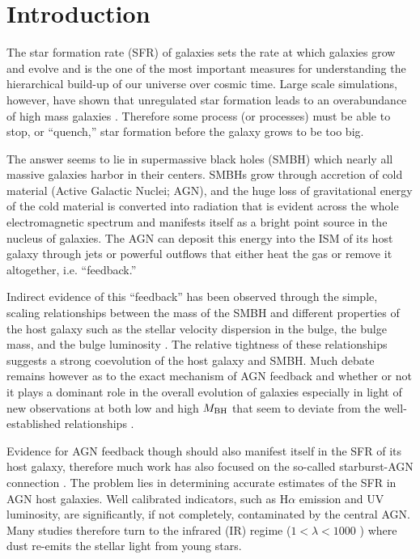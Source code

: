 \section{Introduction}\label{sec:intro}
The star formation rate (SFR) of galaxies sets the rate at which galaxies grow and evolve and is the one of the most important measures for understanding the hierarchical build-up of our universe over cosmic time. Large scale simulations, however, have shown that unregulated star formation leads to an overabundance of high mass galaxies \citep[e.g.][]{Bower:2006gf,Croton:2006kx,Silk:2012fj}. Therefore some process (or processes) must be able to stop, or ``quench,'' star formation before the galaxy grows to be too big.

The answer seems to lie in supermassive black holes (SMBH) which nearly all massive galaxies harbor in their centers. SMBHs grow through accretion of cold material (Active Galactic Nuclei; AGN), and the huge loss of gravitational energy of the cold material is converted into radiation that is evident across the whole electromagnetic spectrum and manifests itself as a bright point source in the nucleus of galaxies. The AGN can deposit this energy into the ISM of its host galaxy through jets \citep[e.g.][]{Fabian:2003ek,Best:2007vn,Lanz:2015bq} or powerful outflows \citep[e.g][]{Alatalo:2011lk,Veilleux:2013qq,Harrison:2014xe,Tombesi:2015fj} that either heat the gas or remove it altogether, i.e. ``feedback.''
  
Indirect evidence of this ``feedback'' has been observed through the simple, scaling relationships between the mass of the SMBH and different properties of the host galaxy such as the stellar velocity dispersion in the bulge, the bulge mass, and the bulge luminosity \citep[e.g.][]{Kormendy:1995mz,Ferrarese:2000gf,Marconi:2003ve,Haring:2004ly,Gultekin:2009ul,Kormendy:2013fj}. The relative tightness of these relationships suggests a strong coevolution of the host galaxy and SMBH. Much debate remains however as to the exact mechanism of AGN feedback and whether or not it plays a dominant role in the overall evolution of galaxies especially in light of new observations at both low and high $M_{\rm BH}$ that seem to deviate from the well-established relationships \citep[see][for a detailed review]{Kormendy:2013fj}. 

Evidence for AGN feedback though should also manifest itself in the SFR of its host galaxy, therefore much work has also focused on the so-called starburst-AGN connection \citep[e.g.][]{Sanders:1988fk,Cid-Fernandes:2001uq,Diamond-Stanic:2012rw,Dixon:2011yq,Rovilos:2012wd,Chen:2013uq,LaMassa:2013hb,Esquej:2014vl,Hickox:2014yq,Mushotzky:2014ad}. The problem lies in determining accurate estimates of the SFR in AGN host galaxies. Well calibrated indicators, such as H$\alpha$ emission and UV luminosity, are significantly, if not completely, contaminated by the central AGN. Many studies therefore turn to the infrared (IR) regime ($1<\lambda<1000$ \um) where dust re-emits the stellar light from young stars.

